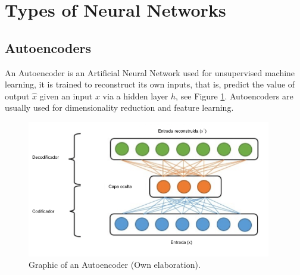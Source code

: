 \section{Types of Neural Networks}

\subsection{Autoencoders}

An Autoencoder is an Artificial Neural Network used for unsupervised machine learning, it is trained to reconstruct its own inputs, that is, predict the value of output $\hat{x}$ given an input $x$ via a hidden layer $h$, see Figure \ref{fig:autoencoder1}. Autoencoders are usually used for dimensionality reduction and feature learning.

\begin{figure}[h!]
  \begin{center}	\includegraphics[width=0.95\textwidth, frame]{imagenes/Cap4/autoencoder}
  \caption{Graphic of an Autoencoder (Own elaboration).}
  \label{fig:autoencoder1}
  \end{center}
\end{figure}

